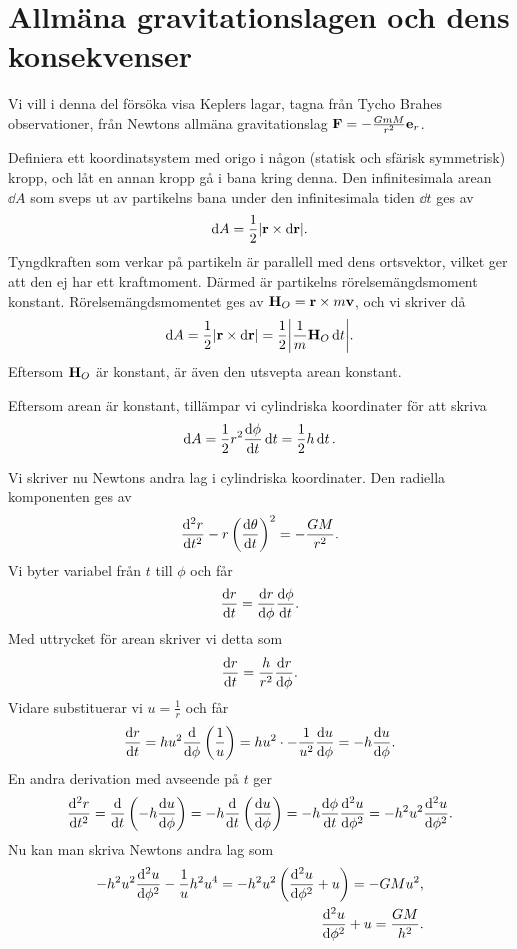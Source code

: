 \section{Allmäna gravitationslagen och dens konsekvenser}

Vi vill i denna del försöka visa Keplers lagar, tagna från Tycho Brahes observationer, från Newtons allmäna gravitationslag $\vb{F} = -\frac{GmM}{r^2}\vb{e}_{r}$.

Definiera ett koordinatsystem med origo i någon (statisk och sfärisk symmetrisk) kropp, och låt en annan kropp gå i bana kring denna. Den infinitesimala arean $\dd{A}$ som sveps ut av partikelns bana under den infinitesimala tiden $\dd{t}$ ges av
\begin{align*}
	\dd{A} = \frac{1}{2}\abs{\vb{r}\times\dd{\vb{r}}}.
\end{align*}
Tyngdkraften som verkar på partikeln är parallell med dens ortsvektor, vilket ger att den ej har ett kraftmoment. Därmed är partikelns rörelsemängdsmoment konstant. Rörelsemängdsmomentet ges av $\vb{H}_{O} = \vb{r}\times m\vb{v}$, och vi skriver då
\begin{align*}
	\dd{A} = \frac{1}{2}\abs{\vb{r}\times\dd{\vb{r}}} = \frac{1}{2}\abs{\frac{1}{m}\vb{H}_{O}\dd{t}}.
\end{align*}
Eftersom $\vb{H}_{O}$ är konstant, är även den utsvepta arean konstant.

Eftersom arean är konstant, tillämpar vi cylindriska koordinater för att skriva
\begin{align*}
	\dd{A} = \frac{1}{2}r^2\dv{\phi}{t}\dd{t} = \frac{1}{2}h\dd{t}.
\end{align*}

Vi skriver nu Newtons andra lag i cylindriska koordinater. Den radiella komponenten ges av
\begin{align*}
	\dv[2]{r}{t} - r\left(\dv{\theta}{t}\right)^2 = -\frac{GM}{r^2}.
\end{align*}
Vi byter variabel från $t$ till $\phi$ och får
\begin{align*}
	\dv{r}{t} = \dv{r}{\phi}\dv{\phi}{t}.
\end{align*}
Med uttrycket för arean skriver vi detta som
\begin{align*}
	\dv{r}{t} = \frac{h}{r^2}\dv{r}{\phi}.
\end{align*}
Vidare substituerar vi $u = \frac{1}{r}$ och får
\begin{align*}
	\dv{r}{t} = hu^2\dv{\phi}\left(\frac{1}{u}\right) = hu^2\cdot -\frac{1}{u^2}\dv{u}{\phi} = -h\dv{u}{\phi}.
\end{align*}
En andra derivation med avseende på $t$ ger
\begin{align*}
	\dv[2]{r}{t} = \dv{t}\left(-h\dv{u}{\phi}\right) = -h\dv{t}\left(\dv{u}{\phi}\right) = -h\dv{\phi}{t}\dv[2]{u}{\phi} = -h^2u^2\dv[2]{u}{\phi}.
\end{align*}
Nu kan man skriva Newtons andra lag som
\begin{align*}
	-h^2u^2\dv[2]{u}{\phi} - \frac{1}{u}h^2u^4 = -h^2u^2\left(\dv[2]{u}{\phi} + u\right) = -GMu^2, \\
	\dv[2]{u}{\phi} + u = \frac{GM}{h^2}.
\end{align*}